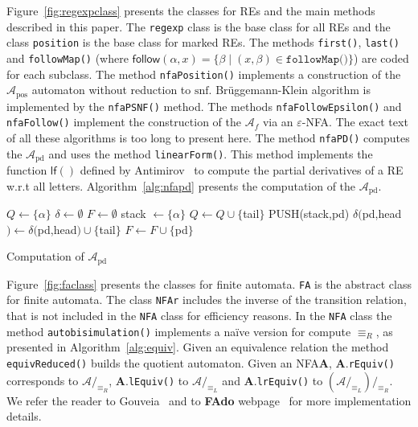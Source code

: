 \documentclass{llncs}
\newcommand{\FAdo}{{\bf FAdo}\xspace}
\newcommand{\NFA}{NFA\xspace}
\newcommand{\re}{RE\xspace}
\newcommand{\res}{REs\xspace}
\newcommand{\snf}{\mbox{$\mathrm{snf}$}\xspace}
\newcommand{\nfa}{\mathcal{A}}
\newcommand{\pos}{{\mathrm{pos}}}
\newcommand{\pd}{{\mathrm{pd}}}
\newcommand{\follow}{\mathsf{follow}}
\let\epsilon=\varepsilon
\begin{document}
Figure~\ref{fig:regexpclass} presents the classes for \res and the
main methods described in this paper.  The \texttt{regexp} class is
the base class for all \res and the class \texttt{position} is the
base class for marked \res. The methods \texttt{first()},
\texttt{last()} and \texttt{followMap()} (where
$\follow(\alpha,x)=\{\beta\mid (x,\beta)\in \texttt{followMap()}\}$)
are coded for each subclass. The method \texttt{nfaPosition()}
implements a construction of the $\nfa_\pos$ automaton without
reduction to \snf. Brüggemann-Klein algorithm is implemented by the
\texttt{nfaPSNF()} method.  The methods \texttt{nfaFollowEpsilon()}
and \texttt{nfaFollow()} implement the construction of the $\nfa_f$ via
an $\epsilon$-\NFA{}. The exact text of all these  algorithms is too long to present
here.  The method \texttt{nfaPD()} computes the $\nfa_\pd$ and uses
the method \texttt{linearForm()}. This method  implements the function
$\mathsf{lf}()$ defined by
Antimirov~\cite{antimirov96:_partial_deriv_regul_expres_finit_autom_const}
to compute the partial derivatives of a \re w.r.t all letters. 
Algorithm~\ref{alg:nfapd} presents the computation of the $\nfa_\pd$.

{\small
\vspace{-0.5cm}
\begin{algorithm}[H]
  \begin{algorithmic}[]
    \STATE $Q \leftarrow \{\alpha\}$
    \STATE $\delta \leftarrow \emptyset$
    \STATE $F \leftarrow \emptyset$
    \STATE stack $\leftarrow \{\alpha\}$
    \STATE $Q \leftarrow Q \cup \{$tail$\}$
    \STATE PUSH(stack,pd)
    \ENDIF
    \STATE $\delta($pd,head$) \leftarrow \delta($pd,head$) \cup \{$tail$\}$
    \ENDFOR
    \IF{$\epsilon($pd$)$}
    \STATE $F \leftarrow F \cup \{$pd$\}$
    \ENDIF
    \ENDWHILE
  \end{algorithmic}
  \caption{Computation of $\nfa_\pd$}
  \label{alg:nfapd}
\end{algorithm}
}
\vspace{-0.5cm}

Figure~\ref{fig:faclass} presents the classes for finite automata.
\texttt{FA} is the abstract class for finite automata. The class
\texttt{NFAr} includes the inverse of the transition relation, that is
not included in the \texttt{NFA} class for efficiency reasons. In the
\texttt{NFA} class the method \texttt{autobisimulation()} implements a
na\"ive version for compute $\equiv_R$, as presented in
Algorithm~\ref{alg:equiv}. Given an equivalence
relation the method \texttt{equivReduced()} builds the quotient
automaton.  Given an \NFA \textbf{A}, \textbf{A}.\texttt{rEquiv()}
corresponds to $\nfa/_{\equiv_R}$, \textbf{A}.\texttt{lEquiv()} to
$\nfa/_{\equiv_L}$ and \textbf{A}.\texttt{lrEquiv()} to
$(\nfa/_{\equiv_L})/_{\equiv_R}$. We refer the reader to
Gouveia~\cite{gouveia09:_de_initos_pequen} and to \FAdo
webpage~\cite{fado} for more implementation details.
\end{document}
